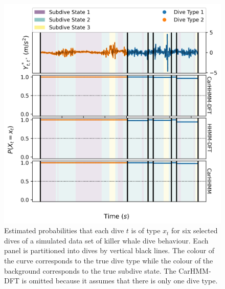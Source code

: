 \begin{figure}[ht]
    \centering
    \includegraphics[width=4.5in]{../Plots/Posterior_Coarse_States.png}
    \caption{Estimated probabilities that each dive $t$ is of type $x_t$ for six selected dives of a simulated data set of killer whale dive behaviour. Each panel is partitioned into dives by vertical black lines. The colour of the curve corresponds to the true dive type while the colour of the background corresponds to the true subdive state. The CarHMM-DFT is omitted because it assumes that there is only one dive type.}
    \label{fig:acc_coarse}
\end{figure}

